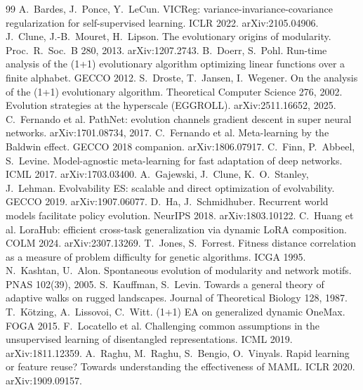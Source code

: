 \documentclass[11pt,a4paper]{article}
\theoremstyle{definition}
\theoremstyle{plain}
\theoremstyle{remark}
\begin{document}
\begin{thebibliography}{99}\small
{} A.~Bardes, J.~Ponce, Y.~LeCun. VICReg: variance-invariance-covariance regularization for self-supervised learning. ICLR 2022. arXiv:2105.04906.
 J.~Clune, J.-B.~Mouret, H.~Lipson. The evolutionary origins of modularity. Proc.\ R.\ Soc.\ B 280, 2013. arXiv:1207.2743.
 B.~Doerr, S.~Pohl. Run-time analysis of the (1+1) evolutionary algorithm optimizing linear functions over a finite alphabet. GECCO 2012.
 S.~Droste, T.~Jansen, I.~Wegener. On the analysis of the (1+1) evolutionary algorithm. Theoretical Computer Science 276, 2002.
 Evolution strategies at the hyperscale (EGGROLL). arXiv:2511.16652, 2025.
 C.~Fernando et al. PathNet: evolution channels gradient descent in super neural networks. arXiv:1701.08734, 2017.
 C.~Fernando et al. Meta-learning by the Baldwin effect. GECCO 2018 companion. arXiv:1806.07917.
 C.~Finn, P.~Abbeel, S.~Levine. Model-agnostic meta-learning for fast adaptation of deep networks. ICML 2017. arXiv:1703.03400.
 A.~Gajewski, J.~Clune, K.~O.~Stanley, J.~Lehman. Evolvability ES: scalable and direct optimization of evolvability. GECCO 2019. arXiv:1907.06077.
 D.~Ha, J.~Schmidhuber. Recurrent world models facilitate policy evolution. NeurIPS 2018. arXiv:1803.10122.
 C.~Huang et al. LoraHub: efficient cross-task generalization via dynamic LoRA composition. COLM 2024. arXiv:2307.13269.
 T.~Jones, S.~Forrest. Fitness distance correlation as a measure of problem difficulty for genetic algorithms. ICGA 1995.
 N.~Kashtan, U.~Alon. Spontaneous evolution of modularity and network motifs. PNAS 102(39), 2005.
 S.~Kauffman, S.~Levin. Towards a general theory of adaptive walks on rugged landscapes. Journal of Theoretical Biology 128, 1987.
 T.~Kötzing, A.~Lissovoi, C.~Witt. (1+1) EA on generalized dynamic OneMax. FOGA 2015.
 F.~Locatello et al. Challenging common assumptions in the unsupervised learning of disentangled representations. ICML 2019. arXiv:1811.12359.
 A.~Raghu, M.~Raghu, S.~Bengio, O.~Vinyals. Rapid learning or feature reuse? Towards understanding the effectiveness of MAML. ICLR 2020. arXiv:1909.09157.

\end{thebibliography}
\end{document}
